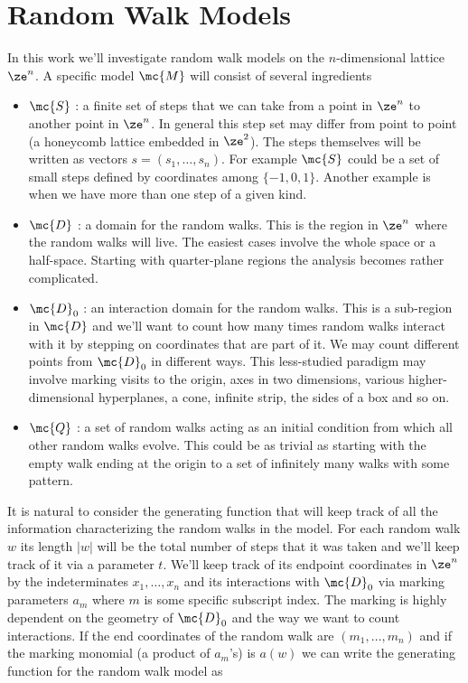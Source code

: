 \section{Random Walk Models}
In this work we'll investigate random walk models on the $n$-dimensional lattice $\ze^n$. A specific model $\mc{M}$ will consist of several ingredients
\begin{itemize}
\item $\mc{S}$ : a finite set of steps that we can take from a point in $\ze^n$ to another point in $\ze^n$. In general this step set may differ from point to point (\eg a honeycomb lattice embedded in $\ze^2$). The steps themselves will be written as vectors $s = (s_1,\ldots, s_n)$. For example $\mc{S}$ could be a set of small steps defined by coordinates among $\{-1,0,1\}$. Another example is when we have more than one step of a given kind. 
\item $\mc{D}$ : a domain for the random walks. This is the region in $\ze^n$ where the random walks will live. The easiest cases involve the whole space or a half-space. Starting with quarter-plane regions the analysis becomes rather complicated.
\item $\mc{D}_0$ : an interaction domain for the random walks. This is a sub-region in $\mc{D}$ and we'll want to count how many times random walks interact with it by stepping on coordinates that are part of it. We may count different points from $\mc{D}_0$ in different ways. This less-studied paradigm may involve marking visits to the origin, axes in two dimensions, various higher-dimensional hyperplanes, a cone, infinite strip, the sides of a box and so on.
\item $\mc{Q}$ : a set of random walks acting as an initial condition from which all other random walks evolve. This could be as trivial as starting with the empty walk ending at the origin to a set of infinitely many walks with some pattern.
\end{itemize}
It is natural to consider the generating function that will keep track of all the information characterizing the random walks in the model. For each random walk $w$ its length $|w|$ will be the total number of steps that it was taken and we'll keep track of it via a parameter $t$. We'll keep track of its endpoint coordinates in $\ze^n$ by the indeterminates $x_1,\ldots,x_n$ and its interactions with $\mc{D}_0$ via marking parameters $a_m$ where $m$ is some specific subscript index. The marking is highly dependent on the geometry of $\mc{D}_0$ and the way we want to count interactions. If the end coordinates of the random walk are $(m_1,\ldots,m_n)$ and if the marking monomial (a product of $a_m$'s) is $a(w)$ we can write the generating  function for the random walk model as
